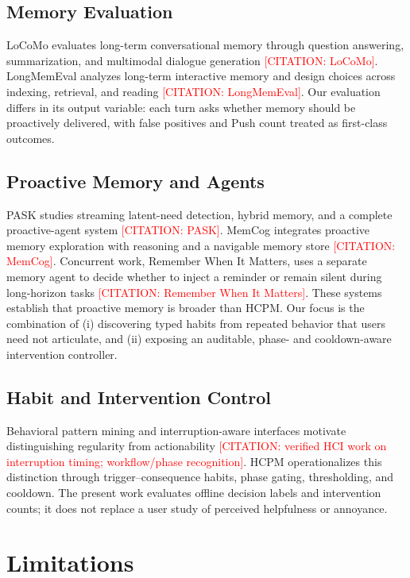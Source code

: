 \documentclass[sigconf,anonymous,review]{acmart}
\newcommand{\citetodo}[1]{\textcolor{red}{[CITATION: #1]}}
\newcommand{\system}{HCPM}
\begin{document}
\subsection{Memory Evaluation}

LoCoMo evaluates long-term conversational memory through question answering, summarization, and multimodal dialogue generation \citetodo{LoCoMo}.
LongMemEval analyzes long-term interactive memory and design choices across indexing, retrieval, and reading \citetodo{LongMemEval}.
Our evaluation differs in its output variable: each turn asks whether memory should be proactively delivered, with false positives and Push count treated as first-class outcomes.

\subsection{Proactive Memory and Agents}

PASK studies streaming latent-need detection, hybrid memory, and a complete proactive-agent system \citetodo{PASK}.
MemCog integrates proactive memory exploration with reasoning and a navigable memory store \citetodo{MemCog}.
Concurrent work, Remember When It Matters, uses a separate memory agent to decide whether to inject a reminder or remain silent during long-horizon tasks \citetodo{Remember When It Matters}.
These systems establish that proactive memory is broader than \system{}.
Our focus is the combination of (i) discovering typed habits from repeated behavior that users need not articulate, and (ii) exposing an auditable, phase- and cooldown-aware intervention controller.

\subsection{Habit and Intervention Control}

Behavioral pattern mining and interruption-aware interfaces motivate distinguishing regularity from actionability \citetodo{verified HCI work on interruption timing; workflow/phase recognition}.
\system{} operationalizes this distinction through trigger--consequence habits, phase gating, thresholding, and cooldown.
The present work evaluates offline decision labels and intervention counts; it does not replace a user study of perceived helpfulness or annoyance.

\section{Limitations}
\end{document}
